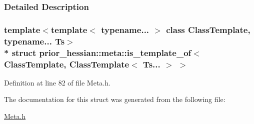 \subsubsection{Detailed Description}
\subsubsection*{template$<$template$<$ typename... $>$ class Class\+Template, typename... Ts$>$\\*
struct prior\+\_\+hessian\+::meta\+::is\+\_\+template\+\_\+of$<$ Class\+Template, Class\+Template$<$ Ts... $>$ $>$}



Definition at line 82 of file Meta.\+h.



The documentation for this struct was generated from the following file\+:\begin{DoxyCompactItemize}
\item 
\hyperlink{Meta_8h}{Meta.\+h}\end{DoxyCompactItemize}
